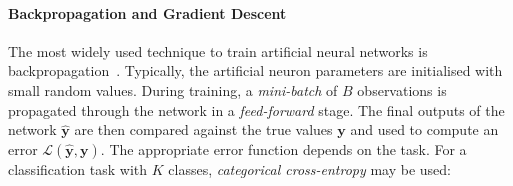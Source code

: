 \begin{figure}
	\centering
	\caption[Activation functions for artificial neural networks]{%
	}%
	\label{fig:activation-functions}
\end{figure}

\paragraph*{Backpropagation and Gradient Descent}

The most widely used technique to train artificial neural networks is backpropagation~\cite{Rumelhart1986}. Typically, the artificial neuron parameters are initialised with small random values. During training, a \emph{mini-batch} of $B$ observations is propagated through the network in a \emph{feed-forward} stage. The final outputs of the network $\bm{\hat{y}}$ are then compared against the true values $\bm{y}$ and used to compute an error $\mathcal{L}(\bm{\hat{y}}, \bm{y})$. The appropriate error function depends on the task. For a classification task with $K$ classes, \emph{categorical cross-entropy} may be used:

